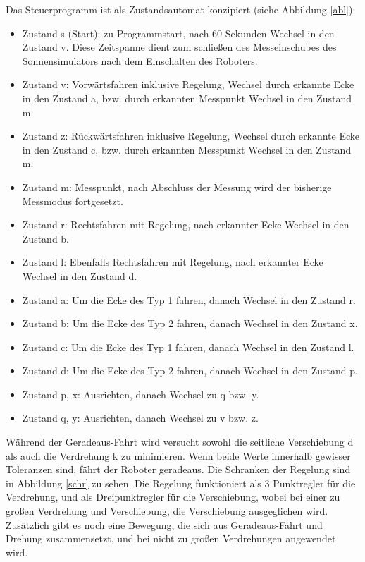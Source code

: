 \documentclass[a4paper,bibtotoc,oneside]{scrbook}
\begin{document}
Das Steuerprogramm ist als Zustandsautomat konzipiert (siehe Abbildung \ref{abl}):
\begin{itemize}
\item Zustand s (Start): zu Programmstart, nach 60 Sekunden Wechsel in den Zustand v. Diese Zeitspanne dient zum schließen des Messeinschubes des Sonnensimulators nach dem Einschalten des Roboters.
\item Zustand v: Vorwärtsfahren inklusive Regelung, Wechsel durch erkannte Ecke in den Zustand a, bzw. durch erkannten Messpunkt Wechsel in den Zustand m.
\item Zustand z: Rückwärtsfahren inklusive Regelung, Wechsel durch erkannte Ecke in den Zustand c, bzw. durch erkannten Messpunkt Wechsel in den Zustand m.
\item Zustand m: Messpunkt, nach Abschluss der Messung wird der bisherige Messmodus fortgesetzt.
\item Zustand r: Rechtsfahren mit Regelung, nach erkannter Ecke Wechsel in den Zustand b.
\item Zustand l: Ebenfalls Rechtsfahren mit Regelung, nach erkannter Ecke Wechsel in den Zustand d.
\item Zustand a: Um die Ecke des Typ 1 fahren, danach Wechsel in den Zustand r. 
\item Zustand b: Um die Ecke des Typ 2 fahren, danach Wechsel in den Zustand x.
\item Zustand c: Um die Ecke des Typ 1 fahren, danach Wechsel in den Zustand l. 
\item Zustand d: Um die Ecke des Typ 2 fahren, danach Wechsel in den Zustand p.
\item Zustand p, x: Ausrichten, danach Wechsel zu q bzw. y.
\item Zustand q, y: Ausrichten, danach Wechsel zu v bzw. z.
\end{itemize}

Während der Geradeaus-Fahrt wird versucht sowohl die seitliche Verschiebung d als auch die Verdrehung k zu minimieren. Wenn beide Werte innerhalb gewisser Toleranzen sind, fährt der Roboter geradeaus. Die Schranken der Regelung sind in Abbildung \ref{schr} zu sehen. Die Regelung funktioniert als 3 Punktregler für die Verdrehung, und als Dreipunktregler für die Verschiebung, wobei bei einer zu großen Verdrehung und Verschiebung, die Verschiebung ausgeglichen wird. Zusätzlich gibt es noch eine Bewegung, die sich aus Geradeaus-Fahrt und Drehung zusammensetzt, und bei nicht zu großen Verdrehungen angewendet wird.
\end{document}
